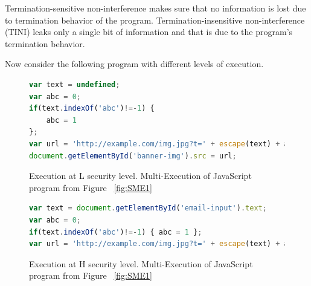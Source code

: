 Termination-sensitive non-interference makes sure that no information is lost due to termination behavior of the program. Termination-insensitive non-interference (TINI) leaks only a single bit of information  and that is due to the program's termination behavior.

Now consider the following program with different levels of execution.

\begin{figure}[h]
  \centering
\begin{lstlisting}[language=JavaScript] 
var text = undefined; 
var abc = 0; 
if(text.indexOf('abc')!=-1) { 
	abc = 1 
}; 
var url = 'http://example.com/img.jpg?t=' + escape(text) + abc;
document.getElementById('banner-img').src = url;
\end{lstlisting}
\caption[Execution at L security level.]
    {Execution at L security level. Multi-Execution of JavaScript program from Figure ~\ref{fig:SME1}}
    \label{fig:SME2}
\end{figure}

\begin{figure}[h]
  \centering
\begin{lstlisting}[language=JavaScript] 
var text = document.getElementById('email-input').text; 
var abc = 0; 
if(text.indexOf('abc')!=-1) { abc = 1 }; 
var url = 'http://example.com/img.jpg?t=' + escape(text) + abc;
\end{lstlisting}
\caption[Execution at H security level.]
    {Execution at H security level. Multi-Execution of JavaScript program from Figure ~\ref{fig:SME1}}
    \label{fig:SME3}
\end{figure}


